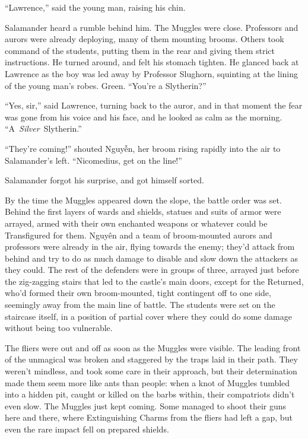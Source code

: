 ``Lawrence,'' said the young man, raising his chin.

Salamander heard a rumble behind him. The Muggles were close. Professors
and aurors were already deploying, many of them mounting brooms. Others
took command of the students, putting them in the rear and giving them
strict instructions. He turned around, and felt his stomach tighten. He
glanced back at Lawrence as the boy was led away by Professor Slughorn,
squinting at the lining of the young man's robes. Green. ``You're a
Slytherin?''

``Yes, sir,'' said Lawrence, turning back to the auror, and in that
moment the fear was gone from his voice and his face, and he looked as
calm as the morning. ``A~\emph{Silver}~Slytherin.''

``They're coming!'' shouted Nguyễn, her broom rising rapidly into the
air to Salamander's left. ``Nicomedius, get on the line!''

Salamander forgot his surprise, and got himself sorted.

By the time the Muggles appeared down the slope, the battle order was
set. Behind the first layers of wards and shields, statues and suits of
armor were arrayed, armed with their own enchanted weapons or whatever
could be Transfigured for them.
Nguy\makebox[0pt][l]{\raisebox{0.5ex}{˜}}ên and a team of broom-mounted
aurors and professors were already in the air, flying towards the enemy;
they'd attack from behind and try to do as much damage to disable and
slow down the attackers as they could. The rest of the defenders were in
groups of three, arrayed just before the zig-zagging stairs that led to
the castle's main doors, except for the Returned, who'd formed their own
broom-mounted, tight contingent off to one side, seemingly away from the
main line of battle. The students were set on the staircase itself, in a
position of partial cover where they could do some damage without being
too vulnerable.

The fliers were out and off as soon as the Muggles were visible. The
leading front of the unmagical was broken and staggered by the traps
laid in their path. They weren't mindless, and took some care in their
approach, but their determination made them seem more like ants than
people: when a knot of Muggles tumbled into a hidden pit, caught or
killed on the barbs within, their compatriots didn't even slow. The
Muggles just kept coming. Some managed to shoot their guns here and
there, where Extinguishing Charms from the fliers had left a gap, but
even the rare impact fell on prepared shields.

